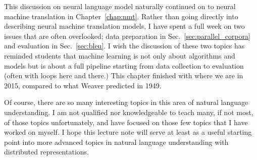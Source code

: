 \documentclass{report}
\begin{document}
This discussion on neural language model naturally continued on to neural
machine translation in Chapter~\ref{chap:nmt}. Rather than going directly into
describing neural machine translation models, I have spent a full week on two
issues that are often overlooked; data preparation in
Sec.~\ref{sec:parallel_corpora} and evaluation in Sec.~\ref{sec:bleu}. I wish
the discussion of these two topics has reminded students that machine learning
is not only about algorithms and models but is about a full pipeline starting
from data collection to evaluation (often with loops here and there.) This
chapter finished with where we are in 2015, compared to what Weaver predicted in
1949.

Of course, there are so many interesting topics in this area of natural language
understanding. I am not qualified nor knowledgeable to teach many, if not most,
of those topics unfortunately, and have focused on those few topics that I have
worked on myself. I hope this lecture note will serve at least as a useful
starting point into more advanced topics in natural language understanding with
distributed representations.














\end{document}
